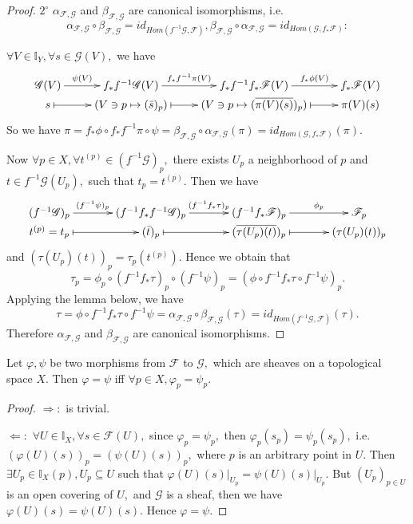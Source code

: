\begin{proof}
$\mathit{2^{\circ}}$ $\alpha_{\mathscr{F},\mathscr{G}}$ and
$\beta_{\mathscr{F},\mathscr{G}}$ are canonical isomorphisms, i.e.
$$\alpha_{\mathscr{F},\mathscr{G}}\circ\beta_{\mathscr{F},\mathscr{G}}
= id_{Hom(f^{-1}\mathscr{G}, \mathscr{F})},
\beta_{\mathscr{F},\mathscr{G}}\circ\alpha_{\mathscr{F},\mathscr{G}}
= id_{Hom(\mathscr{G},f_{\ast}\mathscr{F})}:$$

$\forall V\in \mathds{I}_Y, \forall s\in \mathscr{G}(V),$ we have
\[ \xymatrix@R=0em{
   \mathscr{G}(V) \ar[r]^-{\psi(V)} & f_{\ast}f^{-1}\mathscr{G}(V)
   \ar[r]^-{f_{\ast}f^{-1}\pi(V)} &
   f_{\ast}f^{-1}f_{\ast}\mathscr{F}(V) \ar[r]^-{f_{\ast}\phi(V)} &
   f_{\ast}\mathscr{F}(V)                                       \\
   s \ar@{|->}[r] & (V\ni p\mapsto (\bar{s})_p) \ar@{|->}[r] &
   (V\ni p\mapsto (\overline{\pi(V)(s)})_p) \ar@{|->}[r] & \pi(V)(s) }
\]
So we have $\pi = f_{\ast}\phi\circ f_{\ast}f^{-1}\pi\circ\psi =
\beta_{\mathscr{F},\mathscr{G}}\circ\alpha_{\mathscr{F},\mathscr{G}}(\pi)
= id_{Hom(\mathscr{G},f_{\ast}\mathscr{F})}(\pi).$

Now $\forall p\in X, \forall t^{(p)}\in (f^{-1}\mathscr{G})_p,$
there exists $U_p$ a neighborhood of $p$ and $t\in
f^{-1}\mathscr{G}(U_p),$ such that $t_p=t^{(p)}.$ Then we have
\[ \xymatrix@R=0em@C=3.5em{
   (f^{-1}\mathscr{G})_p \ar[r]^-{(f^{-1}\psi)_p} &
   (f^{-1}f_{\ast}f^{-1}\mathscr{G})_p \ar[r]^-{(f^{-1}f_{\ast}\tau)_p}
   & (f^{-1}f_{\ast}\mathscr{F})_p \ar[r]^-{\phi_p} & \mathscr{F}_p \\
   t^{(p)}=t_p \ar@{|->}[r] & (\bar{t})_p \ar@{|->}[r] &
   (\overline{\tau(U_p)(t)})_p \ar@{|->}[r] & (\tau(U_p)(t))_p } \]
and $(\tau(U_p)(t))_p=\tau_p(t^{(p)}).$ Hence we obtain that
$$\tau_p = \phi_p\circ(f^{-1}f_{\ast}\tau)_p\circ(f^{-1}\psi)_p =
(\phi\circ f^{-1}f_{\ast}\tau\circ f^{-1}\psi)_p.$$ Applying the
lemma below, we have
$$\tau = \phi\circ f^{-1}f_{\ast}\tau\circ f^{-1}\psi =
\alpha_{\mathscr{F},\mathscr{G}}\circ\beta_{\mathscr{F},\mathscr{G}}(\tau)
= id_{Hom(f^{-1}\mathscr{G},\mathscr{F})}(\tau).$$ Therefore
$\alpha_{\mathscr{F},\mathscr{G}}$ and
$\beta_{\mathscr{F},\mathscr{G}}$ are canonical isomorphisms.
\end{proof}
\begin{lemma}
Let $\varphi, \psi$ be two morphisms from $\mathscr{F}$ to
$\mathscr{G},$ which are sheaves on a topological space $X.$ Then
$\varphi=\psi$ iff $\forall p\in X, \varphi_p=\psi_p.$
\end{lemma}
\begin{proof}
$\Longrightarrow:$ is trivial.

$\Longleftarrow:$ $\forall U\in \mathds{I}_X, \forall s\in
\mathscr{F}(U),$ since $\varphi_p=\psi_p,$ then $\varphi_p(s_p) =
\psi_p(s_p),$ i.e. $(\varphi(U)(s))_p = (\psi(U)(s))_p,$ where $p$
is an arbitrary point in $U.$ Then $\exists U_p\in \mathds{I}_X(p),
U_p\subseteq U$ such that
$\left.\varphi(U)(s)\right|_{U_p}=\left.\psi(U)(s)\right|_{U_p}.$
But $(U_p)_{p\in U}$ is an open covering of $U,$ and $\mathscr{G}$
is a sheaf, then we have $\varphi(U)(s)=\psi(U)(s).$ Hence
$\varphi=\psi.$
\end{proof}
